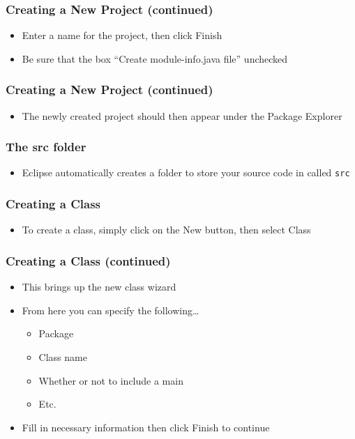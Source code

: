 \documentclass{beamer}
\begin{document}
\begin{frame}[t,fragile] \frametitle{Creating a New Project (continued)} %
    \begin{itemize}
        \item Enter a name for the project, then click Finish
        \item Be sure that the box ``Create module-info.java file'' unchecked
    \end{itemize}
\end{frame}

\begin{frame}[t,fragile] \frametitle{Creating a New Project (continued)} %
    \begin{itemize}
        \item The newly created project should then appear under the Package Explorer
    \end{itemize}
\end{frame}

\begin{frame}[t,fragile] \frametitle{The src folder} %
    \begin{itemize}
        \item Eclipse automatically creates a folder to store your source code in called \texttt{src}
    \end{itemize}
\end{frame}

\begin{frame}[t,fragile] \frametitle{Creating a Class} %
    \begin{itemize}
        \item To create a class, simply click on the New button, then select Class
    \end{itemize}
\end{frame}

\begin{frame}[t,fragile] \frametitle{Creating a Class (continued)} %
    \begin{itemize}
        \item This brings up the new class wizard
        \item From here you can specify the following\ldots
        \begin{itemize}
            \item Package
            \item Class name
            \item Whether or not to include a main
            \item Etc.
        \end{itemize}
        \item Fill in necessary information then click Finish to continue
    \end{itemize}
\end{frame}
\end{document}
